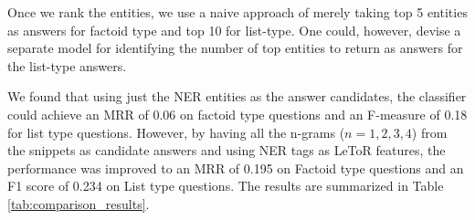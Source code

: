 \documentclass[11pt,a4paper]{article}
\begin{document}


Once we rank the entities, we use a naive approach of merely taking top 5 entities as answers for factoid type and top 10 for list-type. One could, however, devise a separate model for identifying the number of top entities to return as answers for the list-type answers. 

We found that using just the NER entities as the answer candidates, the classifier could achieve an MRR of 0.06 on factoid type questions and an F-measure of 0.18 for list type questions. However, by having all the n-grams ($n = 1, 2, 3, 4$) from the snippets as candidate answers and using NER tags as LeToR features, the performance was improved to an MRR of 0.195 on Factoid type questions and an F1 score of 0.234  on List type questions. The results are summarized in Table \ref{tab:comparison_results}.



\end{document}
